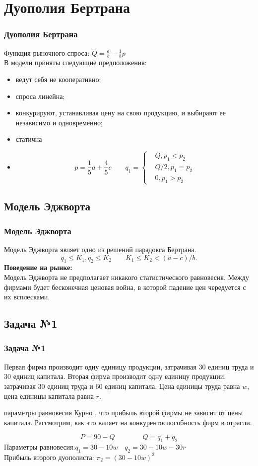 \documentclass {beamer}
\begin{document}
\section{Дуополия Бертрана}
\begin{frame}

\frametitle{Дуополия Бертрана}
Функция рыночного спроса: $Q = \frac{a}{b}- \frac{1}{b}p$\\
В модели приняты следующие предположения: {\begin{itemize}\item {} ведут себя не кооперативно; 
\item {} спроса линейна; 
\item {} конкурируют, устанавливая цену на свою продукцию, и выбирают ее независимо и одновременно; 
\item {} статична\item \pause $$p=\frac{1}{5}a+\frac{4}{5}c\qquad q_1=\left\{ \begin{aligned} &Q, p_1<p_2 \\ &Q/2, p_1=p_2 \\& 0, p_1>p_2 \end{aligned}\right.$$
\end{itemize}}

\end{frame}

\begin{frame} 
\section{Модель Эджворта}
\frametitle{Модель Эджворта}
Модель Эджворта являет одно из решений парадокса Бертрана.
$$q_1  \le K_1, q_2 \le K_2 \qquad K_1 \le K_2 < (a-c) / b.$$
{\bf Поведение на рынке:\\}Модель Эджворта  не предполагает никакого статистического равновесия. Между фирмами будет бесконечная ценовая война, в которой падение цен чередуется с их всплесками.

\end{frame}

\begin{frame}
\section{Задача №1}
\frametitle{Задача №1}
Первая фирма производит одну единицу продукции, затрачивая $30$ единиц труда и $30$ единиц капитала. Вторая фирма производит одну единицу продукции, затрачивая $30$ единиц труда и $60$ единиц капитала. Цена единицы труда равна $w$, цена
	единицы капитала равна $r$. \begin{enumerate}
	 параметры равновесия Курно
	, что прибыль второй фирмы не зависит от цены капитала. Рассмотрим, как это влияет на конкурентоспособность фирм в отрасли.
\end{enumerate}
\begin{block}
{$$ P=90-Q \qquad \qquad Q=q_1+q_2$$}
Параметры равновесия:$q_1=30-10w\quad q_2=30-10w-30r$\\
Прибыль второго дуополиста: $\pi_2=(30-10w)^2$
\end{block}
\end{frame}
\end{document}
